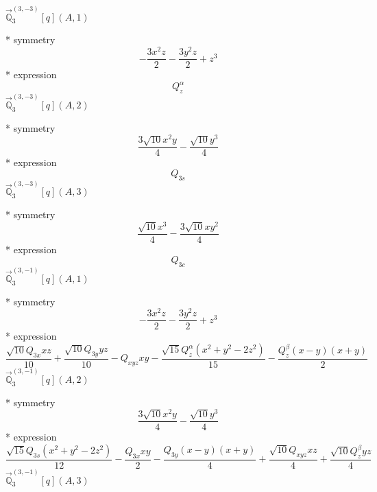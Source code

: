 \documentclass[fleqn,8pt]{jsarticle}
\begin{document}
\noindent\quad $\vec{\mathbb{Q}}_{3}^{(3,-3)}[q](A,1)$

\noindent\quad ** symmetry
\begin{dmath*}
- \frac{3 x^{2} z}{2} - \frac{3 y^{2} z}{2} + z^{3}
\end{dmath*}
\noindent\quad ** expression
\begin{dmath*}
Q_{z}^{\alpha}
\end{dmath*}
\noindent\quad $\vec{\mathbb{Q}}_{3}^{(3,-3)}[q](A,2)$

\noindent\quad ** symmetry
\begin{dmath*}
\frac{3 \sqrt{10} x^{2} y}{4} - \frac{\sqrt{10} y^{3}}{4}
\end{dmath*}
\noindent\quad ** expression
\begin{dmath*}
Q_{3s}
\end{dmath*}
\noindent\quad $\vec{\mathbb{Q}}_{3}^{(3,-3)}[q](A,3)$

\noindent\quad ** symmetry
\begin{dmath*}
\frac{\sqrt{10} x^{3}}{4} - \frac{3 \sqrt{10} x y^{2}}{4}
\end{dmath*}
\noindent\quad ** expression
\begin{dmath*}
Q_{3c}
\end{dmath*}
\noindent\quad $\vec{\mathbb{Q}}_{3}^{(3,-1)}[q](A,1)$

\noindent\quad ** symmetry
\begin{dmath*}
- \frac{3 x^{2} z}{2} - \frac{3 y^{2} z}{2} + z^{3}
\end{dmath*}
\noindent\quad ** expression
\begin{dmath*}
\frac{\sqrt{10} Q_{3x} x z}{10} + \frac{\sqrt{10} Q_{3y} y z}{10} - Q_{xyz} x y - \frac{\sqrt{15} Q_{z}^{\alpha} \left(x^{2} + y^{2} - 2 z^{2}\right)}{15} - \frac{Q_{z}^{\beta} \left(x - y\right) \left(x + y\right)}{2}
\end{dmath*}
\noindent\quad $\vec{\mathbb{Q}}_{3}^{(3,-1)}[q](A,2)$

\noindent\quad ** symmetry
\begin{dmath*}
\frac{3 \sqrt{10} x^{2} y}{4} - \frac{\sqrt{10} y^{3}}{4}
\end{dmath*}
\noindent\quad ** expression
\begin{dmath*}
\frac{\sqrt{15} Q_{3s} \left(x^{2} + y^{2} - 2 z^{2}\right)}{12} - \frac{Q_{3x} x y}{2} - \frac{Q_{3y} \left(x - y\right) \left(x + y\right)}{4} + \frac{\sqrt{10} Q_{xyz} x z}{4} + \frac{\sqrt{10} Q_{z}^{\beta} y z}{4}
\end{dmath*}
\noindent\quad $\vec{\mathbb{Q}}_{3}^{(3,-1)}[q](A,3)$
\end{document}
